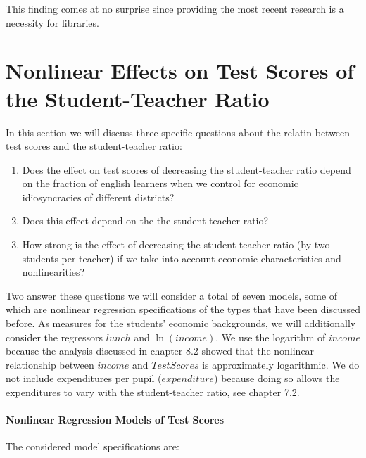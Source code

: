 \documentclass[]{book}
\let\oldparagraph\paragraph
\renewcommand{\paragraph}[1]{\oldparagraph{#1}\mbox{}}
\theoremstyle{definition}
\theoremstyle{definition}
\theoremstyle{definition}
\theoremstyle{remark}
\begin{document}
This finding comes at no surprise since providing the most recent
research is a necessity for libraries.

\section{Nonlinear Effects on Test Scores of the Student-Teacher
Ratio}\label{nonlinear-effects-on-test-scores-of-the-student-teacher-ratio}

In this section we will discuss three specific questions about the
relatin between test scores and the student-teacher ratio:

\begin{enumerate}
\def\labelenumi{\arabic{enumi}.}
\item
  Does the effect on test scores of decreasing the student-teacher ratio
  depend on the fraction of english learners when we control for
  economic idiosyncracies of different districts?
\item
  Does this effect depend on the the student-teacher ratio?
\item
  How strong is the effect of decreasing the student-teacher ratio (by
  two students per teacher) if we take into account economic
  characteristics and nonlinearities?
\end{enumerate}

Two answer these questions we will consider a total of seven models,
some of which are nonlinear regression specifications of the types that
have been discussed before. As measures for the students' economic
backgrounds, we will additionally consider the regressors \(lunch\) and
\(\ln(income)\). We use the logarithm of \(income\) because the analysis
discussed in chapter 8.2 showed that the nonlinear relationship between
\(income\) and \(TestScores\) is approximately logarithmic. We do not
include expenditures per pupil (\(expenditure\)) because doing so allows
the expenditures to vary with the student-teacher ratio, see chapter
7.2.

\paragraph{Nonlinear Regression Models of Test
Scores}\label{nonlinear-regression-models-of-test-scores}

The considered model specifications are:
\end{document}
